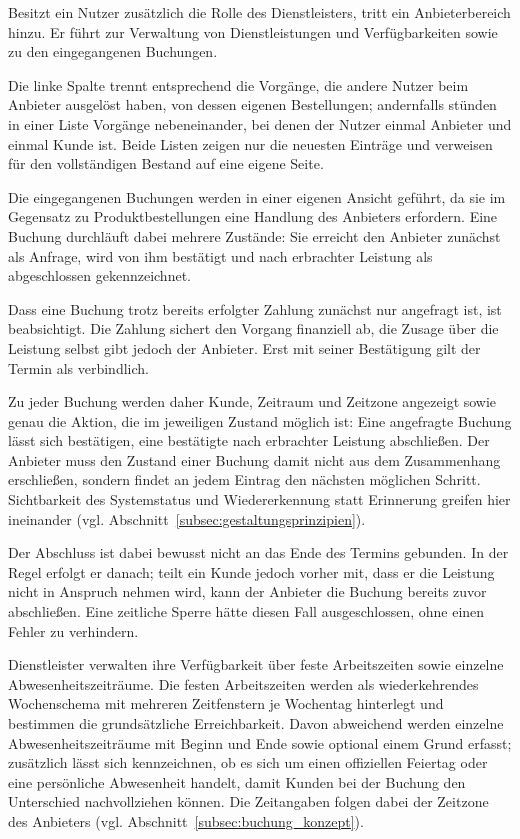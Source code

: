 Besitzt ein Nutzer zusätzlich die Rolle des Dienstleisters, tritt ein
Anbieterbereich hinzu. Er führt zur Verwaltung von Dienstleistungen
und Verfügbarkeiten sowie zu den eingegangenen Buchungen.

Die linke Spalte trennt entsprechend die Vorgänge, die andere Nutzer
beim Anbieter ausgelöst haben, von dessen eigenen Bestellungen;
andernfalls stünden in einer Liste Vorgänge nebeneinander, bei denen
der Nutzer einmal Anbieter und einmal Kunde ist. Beide Listen zeigen
nur die neuesten Einträge und verweisen für den vollständigen Bestand
auf eine eigene Seite.

Die eingegangenen Buchungen werden in einer eigenen Ansicht geführt,
da sie im Gegensatz zu Produktbestellungen eine Handlung des
Anbieters erfordern. Eine Buchung durchläuft dabei mehrere Zustände:
Sie erreicht den Anbieter zunächst als Anfrage, wird von ihm
bestätigt und nach erbrachter Leistung als abgeschlossen
gekennzeichnet.

Dass eine Buchung trotz bereits erfolgter Zahlung zunächst nur
angefragt ist, ist beabsichtigt. Die Zahlung sichert den Vorgang
finanziell ab, die Zusage über die Leistung selbst gibt jedoch der
Anbieter. Erst mit seiner Bestätigung gilt der Termin als
verbindlich.

Zu jeder Buchung werden daher Kunde, Zeitraum und Zeitzone angezeigt
sowie genau die Aktion, die im jeweiligen Zustand möglich ist: Eine
angefragte Buchung lässt sich bestätigen, eine bestätigte nach
erbrachter Leistung abschließen. Der Anbieter muss den Zustand einer
Buchung damit nicht aus dem Zusammenhang erschließen, sondern findet
an jedem Eintrag den nächsten möglichen Schritt. Sichtbarkeit des
Systemstatus und Wiedererkennung statt Erinnerung greifen hier
ineinander (vgl. Abschnitt~\ref{subsec:gestaltungsprinzipien}).

Der Abschluss ist dabei bewusst nicht an das Ende des Termins
gebunden. In der Regel erfolgt er danach; teilt ein Kunde jedoch
vorher mit, dass er die Leistung nicht in Anspruch nehmen wird, kann
der Anbieter die Buchung bereits zuvor abschließen. Eine zeitliche
Sperre hätte diesen Fall ausgeschlossen, ohne einen Fehler zu
verhindern.

Dienstleister verwalten ihre Verfügbarkeit über feste Arbeitszeiten
sowie einzelne Abwesenheitszeiträume. Die festen Arbeitszeiten werden
als wiederkehrendes Wochenschema mit mehreren Zeitfenstern je
Wochentag hinterlegt und bestimmen die grundsätzliche Erreichbarkeit.
Davon abweichend werden einzelne Abwesenheitszeiträume mit Beginn und
Ende sowie optional einem Grund erfasst; zusätzlich lässt sich
kennzeichnen, ob es sich um einen offiziellen Feiertag oder eine
persönliche Abwesenheit handelt, damit Kunden bei der Buchung den
Unterschied nachvollziehen können. Die Zeitangaben folgen dabei der
Zeitzone des Anbieters (vgl. Abschnitt~\ref{subsec:buchung_konzept}).

